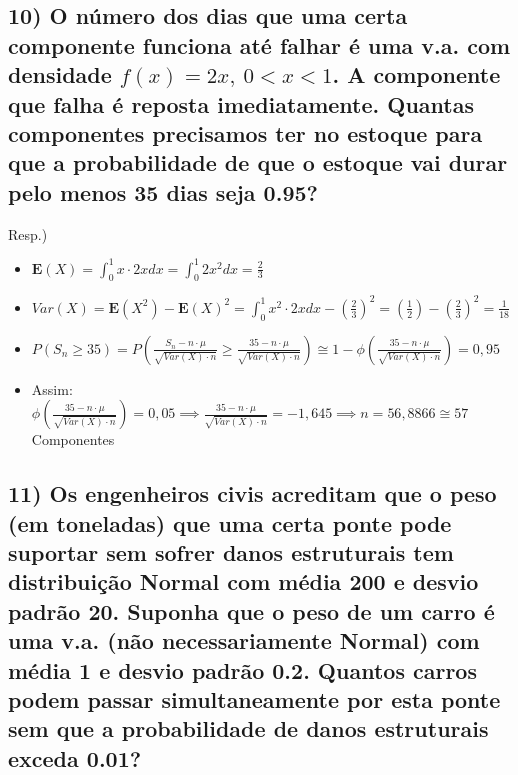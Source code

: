\documentclass[portuguese]{article}
\begin{document}
\subsection*{\textcompwordmark{}}


\subsection*{\textmd{10) O número dos dias que uma certa componente funciona até
falhar é uma v.a. com densidade $f(x)=2x,\ 0<x<1$. A componente que
falha é reposta imediatamente. Quantas componentes precisamos ter
no estoque para que a probabilidade de que o estoque vai durar pelo
menos 35 dias seja 0.95?}}

Resp.) 
\begin{itemize}
\item $\mathbf{E}(X)=\int_{0}^{1}x\cdot2xdx=\int_{0}^{1}2x^{2}dx=\frac{2}{3}$
\item $Var(X)=\mathbf{E}(X^{2})-\mathbf{E}(X)^{2}=\int_{0}^{1}x^{2}\cdot2xdx-\left(\frac{2}{3}\right)^{2}=\left(\frac{1}{2}\right)-\left(\frac{2}{3}\right)^{2}=\frac{1}{18}$
\item $P(S_{n}\ge35)=P(\frac{S_{n}-n\cdot\mu}{\sqrt{Var(X)\cdot n}}\ge\frac{35-n\cdot\mu}{\sqrt{Var(X)\cdot n}})\cong1-\phi(\frac{35-n\cdot\mu}{\sqrt{Var(X)\cdot n}})=0,95$
\item Assim: $\phi(\frac{35-n\cdot\mu}{\sqrt{Var(X)\cdot n}})=0,05\implies\frac{35-n\cdot\mu}{\sqrt{Var(X)\cdot n}}=-1,645\implies n=56,8866\cong57$
Componentes
\end{itemize}

\subsection*{\textcompwordmark{}}


\subsection*{\textmd{11) Os engenheiros civis acreditam que o peso (em toneladas)
que uma certa ponte pode suportar sem sofrer danos estruturais tem
distribuição Normal com média 200 e desvio padrão 20. Suponha que
o peso de um carro é uma v.a. (não necessariamente Normal) com média
1 e desvio padrão 0.2. Quantos carros podem passar simultaneamente
por esta ponte sem que a probabilidade de danos estruturais exceda
0.01?}}
\end{document}
